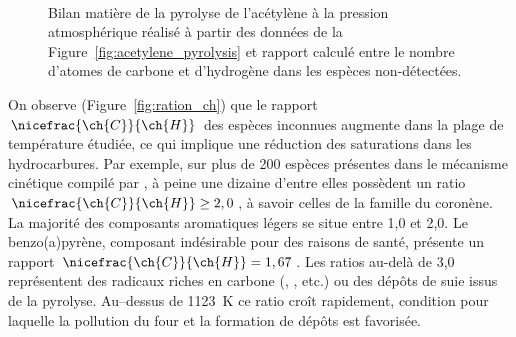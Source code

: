 \begin{figure}[!ht]
  \centering
  \\

  \caption{\label{fig:balance_molaire}Bilan matière de la pyrolyse de l'acétylène à la pression atmosphérique réalisé à partir des données de la Figure~\ref{fig:acetylene_pyrolysis} et rapport  calculé entre le nombre d'atomes de carbone et d'hydrogène dans les espèces non-détectées.}
\end{figure}

On observe (Figure~\ref{fig:ration_ch}) que le rapport $\nicefrac{\ch{C}}{\ch{H}}$ des espèces inconnues augmente dans la plage de température étudiée, ce qui implique une réduction des saturations dans les hydrocarbures.  Par exemple, sur plus de 200 espèces présentes dans le mécanisme cinétique compilé par \citet{Norinaga2007}, à peine une dizaine d'entre elles possèdent un ratio $\nicefrac{\ch{C}}{\ch{H}}\geq2,0$, à savoir celles de la famille du coronène. La majorité des composants aromatiques légers se situe entre 1,0 et 2,0. Le benzo(a)pyrène, composant indésirable pour des raisons de santé, présente un rapport $\nicefrac{\ch{C}}{\ch{H}}=1,67$. Les ratios au-delà de 3,0 représentent des radicaux riches en carbone (, , etc.) ou des dépôts de suie issus de la pyrolyse.  Au--dessus de \SI{1123}{\kelvin} ce ratio croît rapidement, condition pour laquelle la pollution du four et la formation de dépôts est favorisée.

